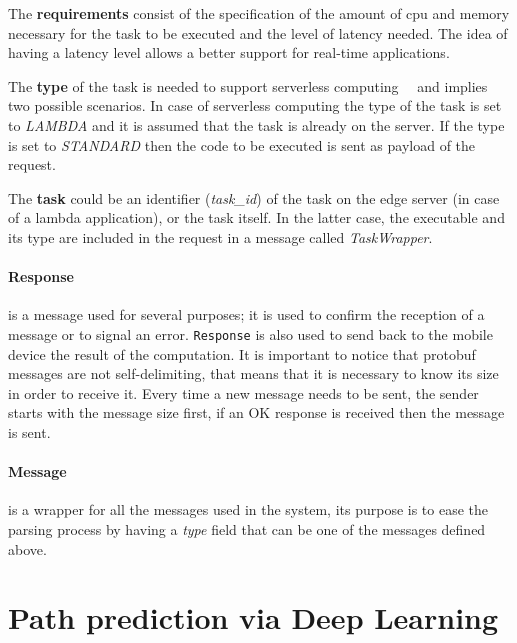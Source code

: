 The \textbf{requirements} consist of the specification of the amount of cpu and memory necessary for the task to be executed and the level of latency needed. The idea of having a latency level allows a better support for real-time applications.

The \textbf{type} of the task is needed to support serverless computing~\cite{hendrickson2016serverless}~\cite{fox2017status} and implies two possible scenarios. In case of serverless computing the type of the task is set to \textit{LAMBDA} and it is assumed that the task is already on the server. If the type is set to \textit{STANDARD} then the code to be executed is sent as payload of the request.

The \textbf{task} could be an identifier (\textit{task\_id}) of the task on the edge server (in case of a lambda application), or the task itself. In the latter case, the executable and its type are included in the request in a message called \textit{TaskWrapper}.

\paragraph{Response} is a message used for several purposes; it is used to confirm the reception of a message or to signal an error. {\tt Response} is also used to send back to the mobile device the result of the computation. It is important to notice that protobuf messages are not self-delimiting, that means that it is necessary to know its size in order to receive it. Every time a new message needs to be sent, the sender starts with the message size first, if an OK response is received then the message is sent.

\paragraph{Message} is a wrapper for all the messages used in the system, its purpose is to ease the parsing process by having a \textit{type} field that can be one of the messages defined above.


\section{Path prediction via Deep Learning}
\label{sec:path_prediction}
